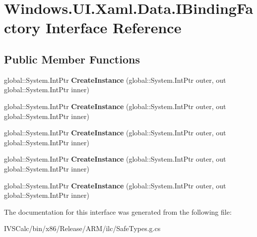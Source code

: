 \hypertarget{interface_windows_1_1_u_i_1_1_xaml_1_1_data_1_1_i_binding_factory}{}\section{Windows.\+U\+I.\+Xaml.\+Data.\+I\+Binding\+Factory Interface Reference}
\label{interface_windows_1_1_u_i_1_1_xaml_1_1_data_1_1_i_binding_factory}
\subsection*{Public Member Functions}
\begin{DoxyCompactItemize}
\item 
\mbox{\label{interface_windows_1_1_u_i_1_1_xaml_1_1_data_1_1_i_binding_factory_a1f0dfc9f376b202d2113fbf1164000b6}} 
global\+::\+System.\+Int\+Ptr {\bfseries Create\+Instance} (global\+::\+System.\+Int\+Ptr outer, out global\+::\+System.\+Int\+Ptr inner)
\item 
\mbox{\label{interface_windows_1_1_u_i_1_1_xaml_1_1_data_1_1_i_binding_factory_a1f0dfc9f376b202d2113fbf1164000b6}} 
global\+::\+System.\+Int\+Ptr {\bfseries Create\+Instance} (global\+::\+System.\+Int\+Ptr outer, out global\+::\+System.\+Int\+Ptr inner)
\item 
\mbox{\label{interface_windows_1_1_u_i_1_1_xaml_1_1_data_1_1_i_binding_factory_a1f0dfc9f376b202d2113fbf1164000b6}} 
global\+::\+System.\+Int\+Ptr {\bfseries Create\+Instance} (global\+::\+System.\+Int\+Ptr outer, out global\+::\+System.\+Int\+Ptr inner)
\item 
\mbox{\label{interface_windows_1_1_u_i_1_1_xaml_1_1_data_1_1_i_binding_factory_a1f0dfc9f376b202d2113fbf1164000b6}} 
global\+::\+System.\+Int\+Ptr {\bfseries Create\+Instance} (global\+::\+System.\+Int\+Ptr outer, out global\+::\+System.\+Int\+Ptr inner)
\item 
\mbox{\label{interface_windows_1_1_u_i_1_1_xaml_1_1_data_1_1_i_binding_factory_a1f0dfc9f376b202d2113fbf1164000b6}} 
global\+::\+System.\+Int\+Ptr {\bfseries Create\+Instance} (global\+::\+System.\+Int\+Ptr outer, out global\+::\+System.\+Int\+Ptr inner)
\end{DoxyCompactItemize}


The documentation for this interface was generated from the following file\+:\begin{DoxyCompactItemize}
\item 
I\+V\+S\+Calc/bin/x86/\+Release/\+A\+R\+M/ilc/Safe\+Types.\+g.\+cs\end{DoxyCompactItemize}
